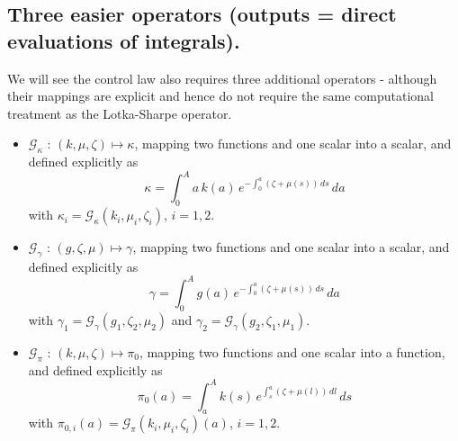 \documentclass[journal,twoside,web]{ieeecolor}
\begin{document}
\subsection{Three easier operators (outputs = direct evaluations of integrals).}
We will see the control law also requires three additional operators - although their mappings are explicit and hence do not require the same computational treatment as the Lotka-Sharpe operator.

\begin{itemize}
    \item $\mathcal{G}_{\kappa}$ : $(k, \mu, \zeta) \mapsto \kappa$, mapping two functions and one scalar into a scalar, and defined explicitly as
\begin{equation}\kappa = \int_0^A a\, k(a)\, e^{-\int_0^a (\zeta+\mu(s))\,ds}\,da\end{equation}
with $\kappa_i = \mathcal{G}_\kappa(k_i, \mu_i, \zeta_i)$, $i=1,2$.

\item $\mathcal{G}_{\gamma}$ : $(g, \zeta, \mu) \mapsto \gamma$, mapping two functions and one scalar into a scalar, and defined explicitly as
\begin{equation}\gamma = \int_0^A g(a)\, e^{-\int_0^a (\zeta+\mu(s))\,ds}\,da\end{equation}
with $\gamma_1 = \mathcal{G}_\gamma(g_1, \zeta_2, \mu_2)$ and $\gamma_2 = \mathcal{G}_\gamma(g_2, \zeta_1, \mu_1)$.

\item $\mathcal{G}_{\pi}$ : $(k, \mu, \zeta) \mapsto \pi_0$, mapping two functions and one scalar into a function, and defined explicitly as
\begin{equation}\pi_0(a) = \int_a^A k(s)\, e^{\int_s^a (\zeta+\mu(l))\,dl}\,ds\end{equation}
with $\pi_{0,i}(a) = \mathcal{G}_\pi(k_i, \mu_i, \zeta_i)(a)$, $i=1,2$.
\end{itemize}
\end{document}
